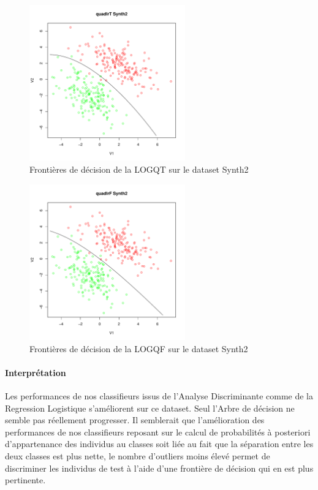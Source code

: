 \documentclass{report}
\begin{document}
\begin{figure}[ht!]
\begin{center}
    \includegraphics[width=0.6\textwidth]{results/quadlrt/quadlrt-Synth2.pdf}
    \caption{Frontières de décision de la LOGQT sur le dataset Synth2}
\end{center}
\end{figure}

\begin{figure}[ht!]
\begin{center}
    \includegraphics[width=0.6\textwidth]{results/quadlrf/quadlrf-Synth2.pdf}
    \caption{Frontières de décision de la LOGQF sur le dataset Synth2}
\end{center}
\end{figure}

\clearpage
\paragraph{Interprétation}
Les performances de nos classifieurs issus de l'Analyse Discriminante comme de la Regression Logistique s'améliorent sur ce dataset. Seul l'Arbre de décision ne semble pas réellement progresser. Il semblerait que l'amélioration des performances de nos classifieurs reposant sur le calcul de probabilités à posteriori d'appartenance des individus au classes soit liée au fait que la séparation entre les deux classes est plus nette, le nombre d'outliers moins élevé permet de discriminer les individus de test à l'aide d'une frontière de décision qui en est plus pertinente.
\end{document}
